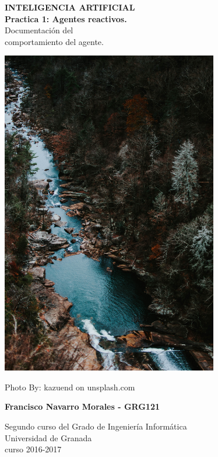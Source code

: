 \documentclass[a4paper, 11pt]{article}
\begin{document}
	
	
	\begin{titlepage}
		\begin{center}

			
			{\Huge \textbf{INTELIGENCIA ARTIFICIAL \\Practica 1: Agentes reactivos.}\\
			Documentación del \\ comportamiento del agente.	}
			
			
		    \centering\includegraphics[width=0.71\textwidth]{cover.jpg}
		    
		    {\footnotesize Photo By: kazuend on unsplash.com } 
			
			
			\textbf{Francisco Navarro Morales - GRG121 }
			
			Segundo curso del Grado de Ingeniería Informática\\
			Universidad de Granada\\
			curso 2016-2017\\
			
		\end{center}
	\end{titlepage}


\end{document}
